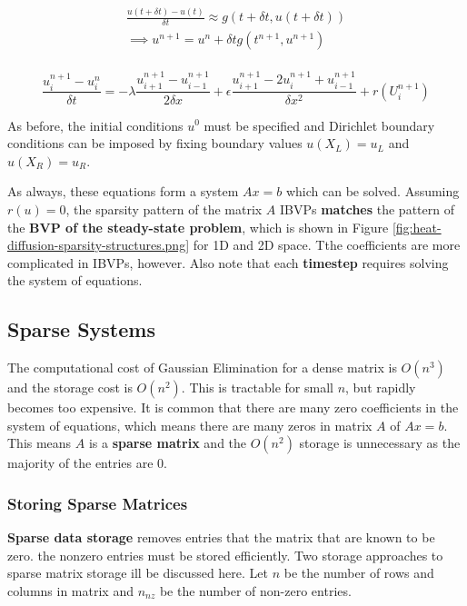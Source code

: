 \documentclass{article}
\begin{document}
\begin{multline}\\
	\frac{u(t + \delta t) - u(t)}{\delta t} \approx g(t + \delta t, u(t + \delta t)) \\
	\implies u^{n+1}= u^n + \delta t g(t^{n+1}, u^{n+1})
	\label{eq:ibvp-backward-euler}
\\ \end{multline}

\begin{equation}
	\frac{u_i^{n + 1} - u_i^n}{\delta t} = -\lambda \frac{u_{i+1}^{n+1} - u_{i-1}^{n+1}}{2 \delta x} + \epsilon \frac{u_{i+1}^{n+1} - 2u_{i}^{n+1} + u_{i-1}^{n+1}}{\delta x^2} + r(U_i^{n+1})
	\label{eq:ivbp-approx-final2}
\end{equation}

As before, the initial conditions $u^0$ must be specified and Dirichlet boundary conditions can be imposed by fixing boundary values $u(X_L) = u_L$ and $u(X_R) = u_R$.

As always, these equations form a system $Ax = b$ which can be solved. Assuming $r(u) = 0$, the sparsity pattern of the matrix $A$ IBVPs \textbf{matches} the pattern of the \textbf{BVP of the steady-state problem}, which is shown in Figure \ref{fig:heat-diffusion-sparsity-structures.png} for 1D and 2D space. Tthe coefficients are more complicated in IBVPs, however. Also note that each \textbf{timestep} requires solving the system of equations.

\subsection{Sparse Systems}

The computational cost of Gaussian Elimination for a dense matrix is $O(n^3)$ and the storage cost is $O(n^2)$. This is tractable for small $n$, but rapidly becomes too expensive. It is common that there are many zero coefficients in the system of equations, which means there are many zeros in matrix $A$ of $Ax = b$. This means $A$ is a \textbf{sparse matrix} and the $O(n^2)$ storage is unnecessary as the majority of the entries are 0.

\subsubsection{Storing Sparse Matrices}

\textbf{Sparse data storage} removes entries that the matrix that are known to be zero. the nonzero entries must be stored efficiently. Two storage approaches to sparse matrix storage ill be discussed here. Let $n$ be the number of rows and columns in matrix and $n_{nz}$ be the number of non-zero entries.
\end{document}
